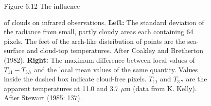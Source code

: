 \begin{figure}[b!]
\vspace{-2ex}
\footnotesize
Figure 6.12 The influence \rule{0pt}{4ex}of clouds on infrared
observations.  \textbf{Left:} The standard deviation of the radiance
from small, partly cloudy areas each containing 64 pixels. The feet of
the arch-like distribution of points are the sea-surface and cloud-top
temperatures. After Coakley and Bretherton (1982). \textbf{Right:} The
maximum difference between local values of $T_{11} - T_{3.7}$ and the
local mean values of the same quantity. Values inside the dashed box
indicate cloud-free pixels. $T_{11}$ and $T_{3.7}$ are the apparent
temperatures at 11.0 and 3.7 $\mu$m (data from K. Kelly). After
Stewart (1985: 137).
\label{fig:cloudalgo}
\end{figure}

